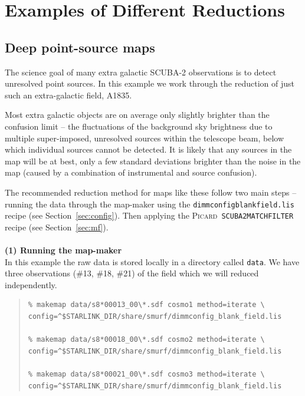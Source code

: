 \documentclass[twoside,11pt]{article}
\newcommand{\xref}[3]{#1}
\newcommand{\xlabel}[1]{}
\renewcommand{\_}{\texttt{\symbol{95}}}
\newenvironment{myquote}{\begin{quote}\begin{small}}{\end{small}\end{quote}}
\newcommand{\picard}{\xref{\textsc{Picard}}{sun265}{}}
\begin{document}
\clearpage
\section{\xlabel{Examples}Examples of Different Reductions}
\label{sec:eg}

\subsection{\xlabel{Cosmology}Deep point-source maps}
\label{sec:cosmology}

The science goal of many extra galactic SCUBA-2 observations is to
detect unresolved point sources. In this example we work through the
reduction of just such an extra-galactic field, A1835.

Most extra galactic objects are on average only slightly brighter than
the confusion limit -- the fluctuations of the background sky
brightness due to multiple super-imposed, unresolved sources within
the telescope beam, below which individual sources cannot be detected.
It is likely that any sources in the map will be at best, only a few
standard deviations brighter than the noise in the map (caused by a
combination of instrumental and source confusion).

The recommended reduction method for maps like these follow two main
steps -- running the data through the map-maker using the
\texttt{dimmconfig\_blank\_field.lis} recipe (see
Section~\ref{sec:config}). Then applying the \picard\
\texttt{SCUBA2\_MATCH\_FILTER} recipe (see Section~\ref{sec:mf}).
\\ \\
\textbf{(1) Running the map-maker}\\
In this example the raw data is stored locally in a directory called
\texttt{data}. We have three observations (\#13, \#18, \#21) of the field
which we will reduced independently.

\begin{myquote}
\begin{verbatim}
% makemap data/s8*00013_00\*.sdf cosmo1 method=iterate \
config=^$STARLINK_DIR/share/smurf/dimmconfig_blank_field.lis

% makemap data/s8*00018_00\*.sdf cosmo2 method=iterate \
config=^$STARLINK_DIR/share/smurf/dimmconfig_blank_field.lis

% makemap data/s8*00021_00\*.sdf cosmo3 method=iterate \
config=^$STARLINK_DIR/share/smurf/dimmconfig_blank_field.lis

\end{verbatim}
\end{myquote}
\end{document}
